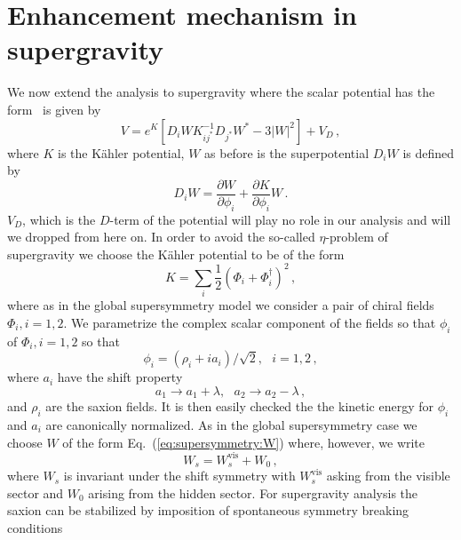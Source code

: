 \documentclass[12pt]{article}
\begin{document}

\section{Enhancement mechanism in supergravity \label{sec:Supergravity}}
We now extend the analysis to supergravity where the scalar potential has the form~\cite{Chamseddine:1982jx, Cremmer:1982en} is given by
\begin{equation} \label{eq:supergravity:potential}
  V = e^K \left[D_i W K^{-1}_{ij^*} D_{j^*} W^* - 3 \left|W\right|^2\right] + V_D\,,
\end{equation}
where $K$ is the K\"ahler potential, $W$ as before is the superpotential $D_i W$ is defined by
\begin{equation} \label{eq:supergravity:DW}
  D_i W = \frac{\partial W}{\partial \phi_i} + \frac{\partial K}{\partial \phi_i} W\,.
\end{equation}
$V_D$, which is the $D$-term of the potential will play no role in our analysis and will we dropped from here on.
In order to avoid the so-called $\eta$-problem of supergravity we choose the K\"ahler potential to be of the form
\begin{equation}
  K = \sum_i \frac{1}{2} \left(\Phi_i + \Phi_i^\dagger\right)^2\,,
\end{equation}
where as in the global supersymmetry model we consider a pair of chiral fields $\Phi_i, i = 1, 2$.
We parametrize the complex scalar component of the fields so that $\phi_i$ of $\Phi_i, i = 1, 2$ so that
\begin{equation}
  \phi_i = \left(\rho_i + i a_i\right) / \sqrt 2,
  ~~~ i = 1, 2\,,
\end{equation}
where $a_i$ have the shift property
\begin{equation}
  a_1 \to a_1 + \lambda,
  ~~~ a_2 \to a_2 - \lambda\,,
\end{equation}
and $\rho_i$ are the saxion fields.
It is then easily checked the the kinetic energy for $\phi_i$ and $a_i$ are canonically normalized.
As in the global supersymmetry case we choose $W$ of the form Eq.~(\ref{eq:supersymmetry:W}) where, however, we write
\begin{equation}
  W_s = W_s^\text{vis} + W_0\,,
\end{equation}
where $W_s$ is invariant under the shift symmetry with $W_s^\text{vis}$ asking from the visible sector and $W_0$ arising from the hidden sector.
For supergravity analysis the saxion can be stabilized by imposition of spontaneous symmetry breaking conditions~\cite{Nath:1983aw}
\end{document}
